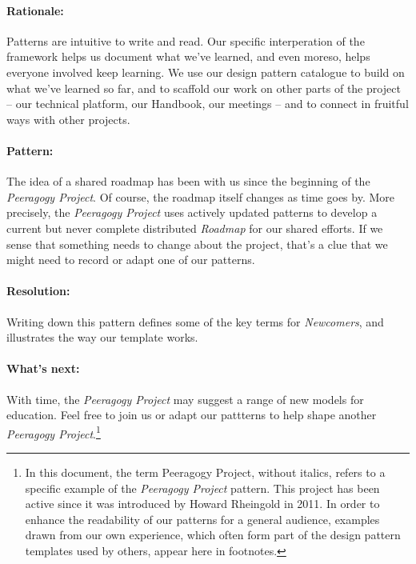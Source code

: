 \paragraph{Rationale:}
Patterns are intuitive to write and read.  Our specific interperation of the framework helps us document what we've learned, and even moreso, helps everyone involved keep learning.  We use our design pattern catalogue to build on what we've learned so far, and to scaffold our work on other parts of the project -- our technical platform, our Handbook, our meetings -- and to connect in fruitful ways with other projects.  

\paragraph{Pattern:}
The idea of a shared roadmap has been with us since the beginning of the \emph{Peeragogy Project}.  Of course, the roadmap itself changes as time goes by.  More precisely, the \emph{Peeragogy Project} uses actively updated patterns to develop a current but never complete distributed \emph{Roadmap} for our shared efforts.  If we sense that something needs to  change about the project, that’s a clue that we might need to record or adapt one of our patterns. 

\paragraph{Resolution:}  
Writing down this pattern defines some of the key terms for \emph{Newcomers}, and illustrates the way our template works. 

\paragraph{What's next:} 
With time, the \emph{Peeragogy Project} may suggest a range of new models for education.  Feel free to join us or adapt our pattterns to help shape another \emph{Peeragogy Project}.\footnote{In this document, the term Peeragogy Project, without italics, refers to a specific example of the \emph{Peeragogy Project} pattern.   This project has been active since it was introduced by Howard Rheingold in 2011.  In order to enhance the readability of our patterns for a general audience, examples drawn from our own experience, which often form part of the design pattern templates used by others, appear here in footnotes.}
